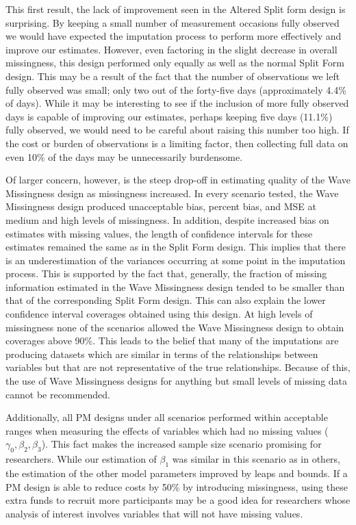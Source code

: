 \documentclass{svjour3}\usepackage[]{graphicx}\usepackage[]{color}
\begin{document}
This first result, the lack of improvement seen in the Altered Split form design is surprising. By keeping a small number of measurement occasions fully observed we would have expected the imputation process to perform more effectively and improve our estimates. However, even factoring in the slight decrease in overall missingness, this design performed only equally as well as the normal Split Form design. This may be a result of the fact that the number of observations we left fully observed was small; only two out of the forty-five days (approximately 4.4\% of days). While it may be interesting to see if the inclusion of more fully observed days is capable of improving our estimates, perhaps keeping five days (11.1\%) fully observed, we would need to be careful about raising this number too high. If the cost or burden of observations is a limiting factor, then collecting full data on even 10\% of the days may be unnecessarily burdensome. \par

Of larger concern, however, is the steep drop-off in estimating quality of the Wave Missingness design as missingness increased. In every scenario tested, the Wave Missingness design produced unacceptable bias, percent bias, and MSE at medium and high levels of missingness. In addition, despite increased bias on estimates with missing values, the length of confidence intervals for these estimates remained the same as in the Split Form design. This implies that there is an underestimation of the variances occurring at some point in the imputation process. This is supported by the fact that, generally, the fraction of missing information estimated in the Wave Missingness design tended to be smaller than that of the corresponding Split Form design. This can also explain the lower confidence interval coverages obtained using this design. At high levels of missingness none of the scenarios allowed the Wave Missingness design to obtain coverages above 90\%. This leads to the belief that many of the imputations are producing datasets which are similar in terms of the relationships between variables but that are not representative of the true relationships. Because of this, the use of Wave Missingness designs for anything but small levels of missing data cannot be recommended. \par

Additionally, all PM designs under all scenarios performed within acceptable ranges when measuring the effects of variables which had no missing values ($\gamma_0, \beta_2, \beta_3$). This fact makes the increased sample size scenario promising for researchers. While our estimation of $\beta_1$ was similar in this scenario as in others, the estimation of the other model parameters improved by leaps and bounds. If a PM design is able to reduce costs by 50\% by introducing missingness, using these extra funds to recruit more participants may be a good idea for researchers whose analysis of interest involves variables that will not have missing values. \par
\end{document}
